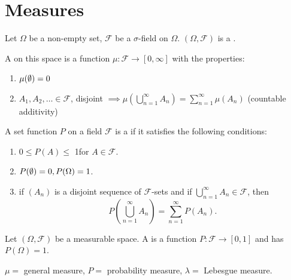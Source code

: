 \documentclass[class=article,crop=false]{standalone}
\begin{document}
\section{Measures}
\begin{defn}
	Let $\Omega$ be a non-empty set, $\mathcal{F}$ be a $\sigma$-field on $\Omega$. $(\Omega,\mathcal{F})$ is a . 
\end{defn}

\begin{defn}[measure]
	A  on this space is a function $\mu: \mathcal{F} \to [0,\infty]$ with the properties:
	\begin{enumerate}[label=(\roman*)]
		\item  $\mu(\emptyset)=0$
		\item $A_1,A_2,\ldots \in \mathcal{F}$, disjoint $\implies \mu\left( \bigcup_{n= 1}^{\infty} A_n \right) = \sum_{ n=1}^{\infty} \mu(A_n)$ (countable additivity)
	\end{enumerate}
\end{defn}

\begin{defn}
	A set function $P$ on a  field $\mathcal{F}$ is a  if it satisfies the following conditions:
\begin{enumerate}[label=(\roman*)]
	\item $0\leq P(A) \leq$ 1for $A \in \mathcal{F}$.
	\item $P(\emptyset) = 0, P(\Omega)=1$.
	\item if $(A_n)$ is a disjoint sequence of  $\mathcal{F}$-sets and if $\bigcup_{ n =1}^{\infty} A_n \in \mathcal{F}$, then
		\[
			P\left( \bigcup_{ n =1}^{\infty} A_n \right) = \sum_{ n=1}^{\infty} P(A_n)
		.\] 
\end{enumerate}
\end{defn}

\begin{defn}
	Let $(\Omega,\mathcal{F})$ be a measurable space. A  is a function $P: \mathcal{F} \to [0,1]$ and has $P(\Omega) =1$.

\end{defn}

\begin{notation}
	$\mu=$ general measure, $P=$ probability measure,  $\lambda=$ Lebesgue measure.
\end{notation}
\end{document}
